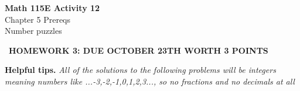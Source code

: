 \documentclass[12pt]{article}
\begin{document}
\begin{center}
    \Large \textbf{Math 115E Activity 12} \\
    \vspace{0.2cm}
    \normalsize Chapter 5 Prereqs \\
    \normalsize Number puzzles
\end{center}
\
\textbf{HOMEWORK 3: DUE OCTOBER 23TH WORTH 3 POINTS}
\begin{tcolorbox}[
    width=\linewidth,
    colframe=black,         %
    colback=white,          %
    boxrule=0.5pt,          %
    left=1mm, right=1.1mm,    %
    top=1mm, bottom=1mm,    %
    arc=2mm                 %
]
\textbf{Helpful tips.} 
\textit{All of the solutions to the following problems will be integers\\
meaning numbers like ...-3,-2,-1,0,1,2,3..., so no fractions and no decimals at all}
\end{tcolorbox}
\end{document}
